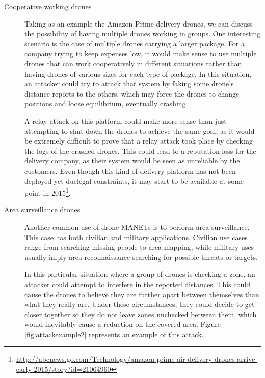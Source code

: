 \documentclass{article}
\begin{document}
\begin{description}
  \item[Cooperative working drones] Taking as an example the Amazon Prime delivery drones, we can discuss the possibility of having multiple drones working in groups. One interesting scenario is the case of multiple drones carrying a larger package. For a company trying to keep expenses low, it would make sense to use multiple drones that can work cooperatively in different situations rather than having drones of various sizes for each type of package. In this situation, an attacker could try to attack that system by faking some drone's distance reports to the others, which may force the drones to change positions and loose equilibrium, eventually crashing.
 
  A relay attack on this platform could make more sense than just attempting to shut down the drones to achieve the same goal, as it would be extremely difficult to prove that a relay attack took place by checking the logs of the crashed drones. This could lead to a reputation loss for the delivery company, as their system would be seen as unreliable by the customers. Even though this kind of delivery platform has not been deployed yet duelegal constraints, it may start to be available at some point in 2015\footnote{\url{http://abcnews.go.com/Technology/amazon-prime-air-delivery-drones-arrive-early-2015/story?id=21064960}}.
  
  
  \item[Area surveillance drones] Another common use of drone MANETs is to perform area surveillance. This case has both civilian and military applications. Civilian use cases range from searching missing people to area mapping, while military uses usually imply area reconnaissance searching for possible threats or targets. 
  
  In this particular situation where a group of drones is checking a zone, an attacker could attempt to interfere in the reported distances. This could cause the drones to believe they are further apart between themselves than what they really are. Under these circumstances, they could decide to get closer together so they do not leave zones unchecked between them, which would inevitably cause a reduction on the covered area. Figure \ref{fig:attackexample2} represents an example of this attack.
  

\end{description}
\end{document}
